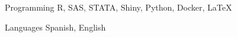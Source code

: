 

\begin{cvskills}

  \cvskill
    {Programming} %
    {R, SAS, STATA, Shiny, Python, Docker, LaTeX} %

  \cvskill
    {Languages} %
    {Spanish, English} %

\end{cvskills}
